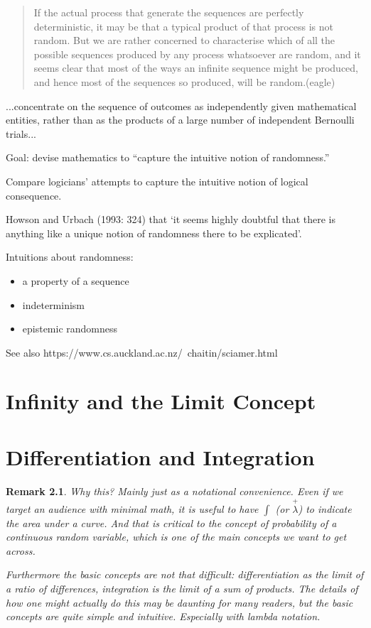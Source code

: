 \documentclass[reqno,12pt]{tufte-book}
\numberwithin{equation}{subsection}
\newtheorem{remark}{Remark}
\begin{document}
\blockquote{If the actual process that generate the sequences are perfectly deterministic, it may be that a typical product of that process is not random. But we are rather concerned to characterise which of all the possible sequences produced by any process whatsoever are random, and it seems clear that most of the ways an infinite sequence might be produced, and hence most of the sequences so produced, will be random.(eagle)}

...concentrate on the sequence of outcomes as independently given mathematical entities, rather than as the products of a large number of independent Bernoulli trials...


Goal: devise mathematics to ``capture the intuitive notion of randomness.''

Compare logicians' attempts to capture the intuitive notion of logical consequence.

 Howson and Urbach (1993: 324) that ‘it seems highly doubtful that there is anything like a unique notion of randomness there to be explicated’.

Intuitions about randomness:

\begin{itemize}
\item a property of a sequence
\item indeterminism
\item epistemic randomness
\end{itemize}


See also https://www.cs.auckland.ac.nz/~chaitin/sciamer.html

\chapter{Infinity and the Limit Concept}

\chapter{Differentiation and Integration}

\begin{remark}
  Why this?  Mainly just as a notational convenience.  Even if we target an
  audience with minimal math, it is useful to have $\int$ (or
  $\overset{+}{\lambda}$) to indicate the area under a curve.  And
  that is critical to the concept of probability of a continuous
  random variable, which is one of the main concepts we want to get
  across.

  Furthermore the basic concepts are not that difficult:
  differentiation as the limit of a ratio of differences, integration
  is the limit of a sum of products.  The details of how one might
  actually do this may be daunting for many readers, but the basic
  concepts are quite simple and intuitive.  Especially with lambda
  notation.
\end{remark}
\end{document}
